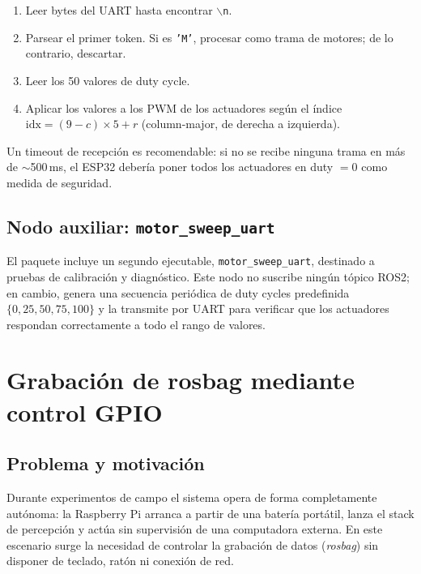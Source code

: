\begin{enumerate}
  \item Leer bytes del UART hasta encontrar \texttt{$\backslash$n}.
  \item Parsear el primer token. Si es \texttt{'M'}, procesar como trama
        de motores; de lo contrario, descartar.
  \item Leer los 50 valores de duty cycle.
  \item Aplicar los valores a los PWM de los actuadores según el índice
        $\text{idx} = (9 - c) \times 5 + r$ (column-major, de derecha a
        izquierda).
\end{enumerate}

Un timeout de recepción es recomendable: si no se recibe ninguna trama en
más de $\sim$500\,ms, el ESP32 debería poner todos los actuadores en duty
$= 0$ como medida de seguridad.

\subsection{Nodo auxiliar: \texttt{motor\_sweep\_uart}}
\label{sec:hw-motor-sweep}

El paquete incluye un segundo ejecutable, \texttt{motor\_sweep\_uart}, destinado
a pruebas de calibración y diagnóstico. Este nodo no suscribe ningún tópico
ROS2; en cambio, genera una secuencia periódica de duty cycles predefinida
$\{0, 25, 50, 75, 100\}$ y la transmite por UART para verificar que los
actuadores respondan correctamente a todo el rango de valores.

\section{Grabación de rosbag mediante control GPIO}
\label{sec:gpio-rosbag-controller}

\subsection{Problema y motivación}
\label{sec:gpio-rosbag-motivation}

Durante experimentos de campo el sistema opera de forma completamente autónoma:
la Raspberry Pi arranca a partir de una batería portátil, lanza el stack de
percepción y actúa sin supervisión de una computadora externa. En este escenario
surge la necesidad de controlar la grabación de datos (\emph{rosbag}) sin
disponer de teclado, ratón ni conexión de red.

